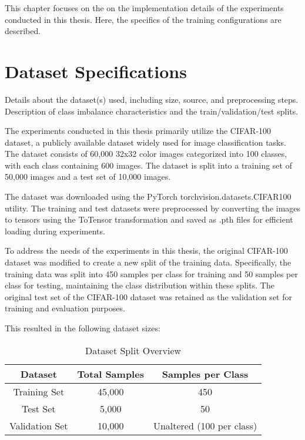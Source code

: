 
This chapter focuses on the on the implementation details of the experiments conducted in this thesis. Here, the specifics of the training configurations are described. 

\section{Dataset Specifications}
Details about the dataset(s) used, including size, source, and preprocessing steps.
Description of class imbalance characteristics and the train/validation/test splits.

The experiments conducted in this thesis primarily utilize the CIFAR-100 dataset, a publicly available dataset widely used for image classification tasks. The dataset consists of 60,000 32x32 color images categorized into 100 classes, with each class containing 600 images. The dataset is split into a training set of 50,000 images and a test set of 10,000 images.

The dataset was downloaded using the PyTorch torchvision.datasets.CIFAR100 utility. The training and test datasets were preprocessed by converting the images to tensors using the ToTensor transformation and saved as .pth files for efficient loading during experiments. 

To address the needs of the experiments in this thesis, the original CIFAR-100 dataset was modified to create a new split of the training data. Specifically, the training data was split into 450 samples per class for training and 50 samples per class for testing, maintaining the class distribution within these splits. The original test set of the CIFAR-100 dataset was retained as the validation set for training and evaluation purposes.

This resulted in the following dataset sizes:

\begin{table}[h]
    \centering
    \caption{Dataset Split Overview}
    \begin{tabular}{|c|c|c|}
    \hline
    \textbf{Dataset}    & \textbf{Total Samples} & \textbf{Samples per Class} \\ \hline
    Training Set        & 45,000                & 450                        \\ \hline
    Test Set            & 5,000                 & 50                         \\ \hline
    Validation Set      & 10,000                & Unaltered (100 per class)  \\ \hline
    \end{tabular}
    \label{tab:dataset_split}
\end{table}

